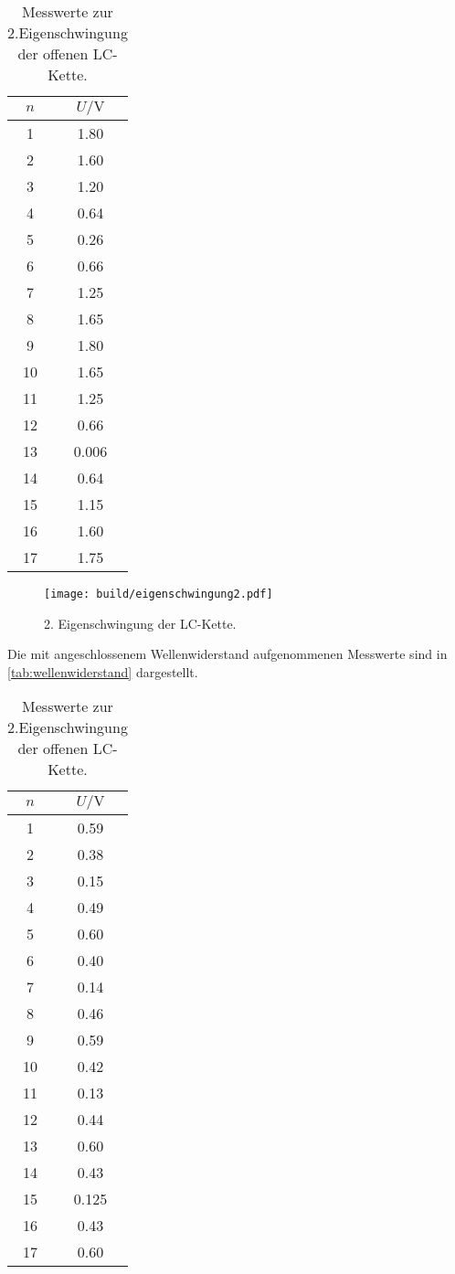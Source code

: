 \begin{table}
  \centering
  \caption{Messwerte zur 2.Eigenschwingung der offenen LC-Kette.}
  \label{tab:eigenschwingung2}
  \begin{tabular}{c c}
    \toprule
    $n$ & $U / \si{\volt}$ \\
\midrule
1 & 1.80 \\
2 & 1.60 \\
3 & 1.20 \\
4 & 0.64 \\
5 & 0.26 \\
6 & 0.66 \\
7 & 1.25 \\
8 & 1.65 \\
9 & 1.80 \\
10 & 1.65 \\
11 & 1.25 \\
12 & 0.66 \\
13 & 0.006 \\
14 & 0.64 \\
15 & 1.15 \\
16 & 1.60 \\
17 & 1.75 \\
\bottomrule
\end{tabular}
\end{table}

\begin{figure}
  \centering
  \texttt{[image: build/eigenschwingung2.pdf]}
\caption{2. Eigenschwingung der LC-Kette.}
  \label{fig:eigenschwingung2}
\end{figure}

Die mit angeschlossenem Wellenwiderstand aufgenommenen Messwerte sind in \ref{tab:wellenwiderstand} dargestellt.
\begin{table}
  \centering
  \caption{Messwerte zur 2.Eigenschwingung der offenen LC-Kette.}
  \label{tab:eigenschwingung2}
  \begin{tabular}{c c}
    \toprule
    $n$ & $U / \si{\volt}$\\
    \midrule
1 & 0.59 \\
2 & 0.38 \\
3 & 0.15 \\
4 & 0.49 \\
5 & 0.60 \\
6 & 0.40 \\
7 & 0.14 \\
8 & 0.46 \\
9 & 0.59 \\
10 & 0.42 \\
11 & 0.13 \\
12 & 0.44 \\
13 & 0.60 \\
14 & 0.43 \\
15 & 0.125 \\
16 & 0.43 \\
17 & 0.60 \\
\bottomrule
\end{tabular}
\end{table}

